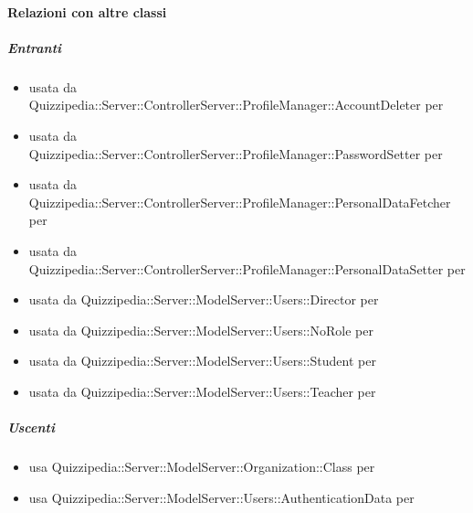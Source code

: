 \paragraph{Relazioni con altre classi}
\subparagraph{Entranti}
\begin{itemize}
\item usata da Quizzipedia::Server::ControllerServer::ProfileManager::AccountDeleter per 
\item usata da Quizzipedia::Server::ControllerServer::ProfileManager::PasswordSetter per 
\item usata da Quizzipedia::Server::ControllerServer::ProfileManager::PersonalDataFetcher per 
\item usata da Quizzipedia::Server::ControllerServer::ProfileManager::PersonalDataSetter per 
\item usata da Quizzipedia::Server::ModelServer::Users::Director per 
\item usata da Quizzipedia::Server::ModelServer::Users::NoRole per 
\item usata da Quizzipedia::Server::ModelServer::Users::Student per 
\item usata da Quizzipedia::Server::ModelServer::Users::Teacher per 
\end{itemize}
\subparagraph{Uscenti}
\begin{itemize}
\item usa Quizzipedia::Server::ModelServer::Organization::Class per 
\item usa Quizzipedia::Server::ModelServer::Users::AuthenticationData per 
\end{itemize}
